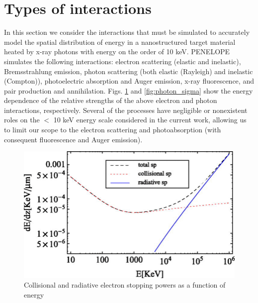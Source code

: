 \documentclass [11pt, proquest, article] {uwthesis}[2016/11/22]
\begin{document}
\section{Types of interactions}
In this section we consider the interactions that must be simulated to accurately model the spatial distribution of energy in a nanostructured target material heated by x-ray photons with energy on the order of 10 keV.
PENELOPE simulates the following interactions: electron scattering (elastic and inelastic), Bremsstrahlung emission, photon scattering (both elastic (Rayleigh) and inelastic (Compton)), photoelectric absorption and Auger emission, x-ray fluorescence, and pair production and annihilation. 
Figs. \ref{fig:sp} and \ref{fig:photon_sigma} show the energy dependence of the relative strengths of the above electron and photon interactions, respectively. 
Several of the processes have negligible or nonexistent roles on the $<$ 10 keV energy scale considered in the current work, allowing us to limit our scope to the electron scattering and photoabsorption (with consequent fluorescence and Auger emission).

\begin{figure}[h] 
\caption{Collisional and radiative electron stopping powers as a function of energy \cite{volpe2013collisional}}
\label{fig:sp}
\centering
\includegraphics[scale=0.4]{../Figures/collisional_sp.png}
\end{figure}
\end{document}
